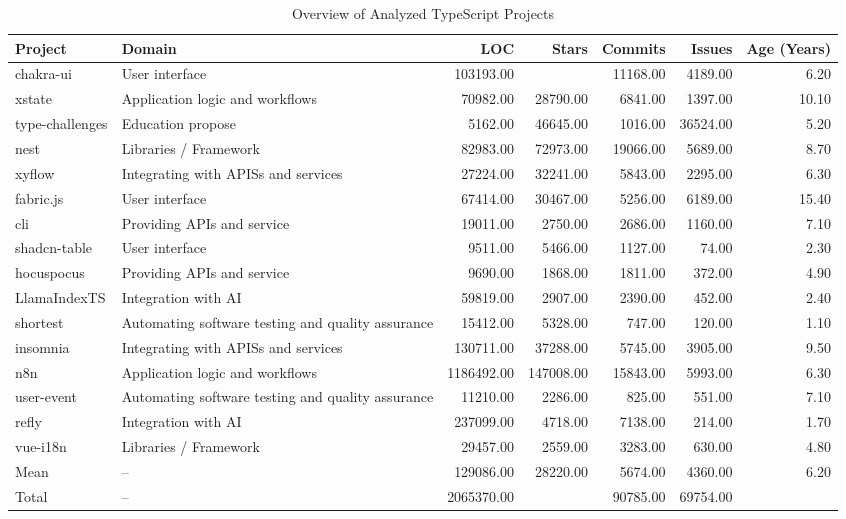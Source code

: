 \begin{table}[ht]
\centering
\caption{Overview of Analyzed TypeScript Projects} 
\label{tab:benchmarks}
\begingroup\scriptsize
\begin{tabular}{llrrrrr}
  \hline
Project & Domain & LOC & Stars & Commits & Issues & Age (Years) \\ 
  \hline
chakra-ui & User interface & 103193.00 &  & 11168.00 & 4189.00 & 6.20 \\ 
  xstate & Application logic and workflows & 70982.00 & 28790.00 & 6841.00 & 1397.00 & 10.10 \\ 
  type-challenges & Education propose & 5162.00 & 46645.00 & 1016.00 & 36524.00 & 5.20 \\ 
  nest & Libraries / Framework & 82983.00 & 72973.00 & 19066.00 & 5689.00 & 8.70 \\ 
  xyflow & Integrating with APISs and services & 27224.00 & 32241.00 & 5843.00 & 2295.00 & 6.30 \\ 
  fabric.js & User interface & 67414.00 & 30467.00 & 5256.00 & 6189.00 & 15.40 \\ 
  cli & Providing APIs and service & 19011.00 & 2750.00 & 2686.00 & 1160.00 & 7.10 \\ 
  shadcn-table & User interface & 9511.00 & 5466.00 & 1127.00 & 74.00 & 2.30 \\ 
  hocuspocus & Providing APIs and service & 9690.00 & 1868.00 & 1811.00 & 372.00 & 4.90 \\ 
  LlamaIndexTS & Integration with AI & 59819.00 & 2907.00 & 2390.00 & 452.00 & 2.40 \\ 
  shortest & Automating software testing and quality assurance & 15412.00 & 5328.00 & 747.00 & 120.00 & 1.10 \\ 
  insomnia & Integrating with APISs and services & 130711.00 & 37288.00 & 5745.00 & 3905.00 & 9.50 \\ 
  n8n & Application logic and workflows & 1186492.00 & 147008.00 & 15843.00 & 5993.00 & 6.30 \\ 
  user-event & Automating software testing and quality assurance & 11210.00 & 2286.00 & 825.00 & 551.00 & 7.10 \\ 
  refly & Integration with AI & 237099.00 & 4718.00 & 7138.00 & 214.00 & 1.70 \\ 
  vue-i18n & Libraries / Framework & 29457.00 & 2559.00 & 3283.00 & 630.00 & 4.80 \\ 
  Mean & -- & 129086.00 & 28220.00 & 5674.00 & 4360.00 & 6.20 \\ 
  Total & -- & 2065370.00 &  & 90785.00 & 69754.00 &  \\ 
   \hline
\end{tabular}
\endgroup
\end{table}
